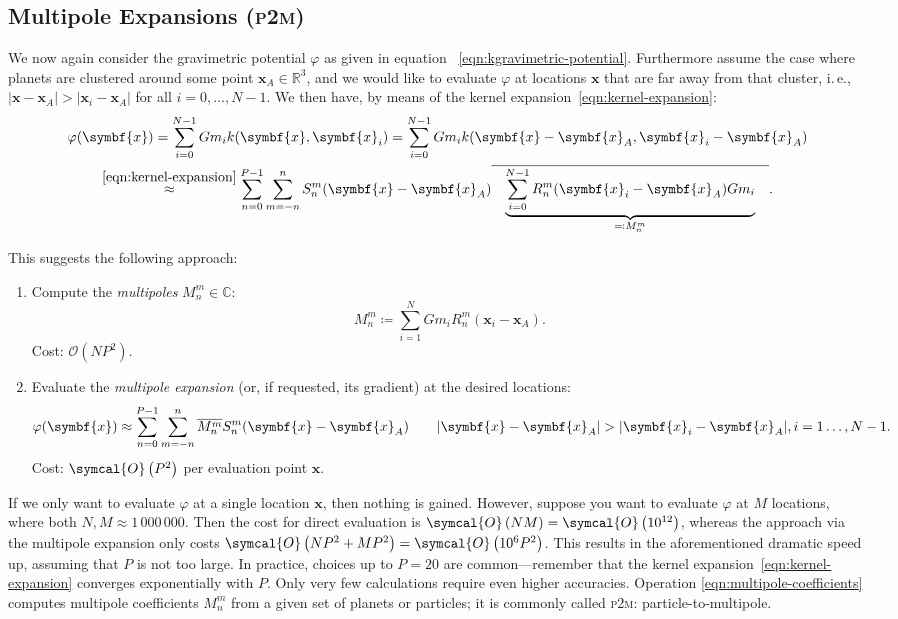 \documentclass{scrbook}
\newcommand{\PtoM}{\textsc{p2m}}
\newcommand{\reals}{\ensuremath{\mathbb{R}}}
\newcommand{\complex}{\mathbb{C}}
\newcommand{\wholespace}{\ensuremath{\reals^3}}
\newcommand{\vv}[1]{\ensuremath{\symbf{#1}}} %
\newcommand{\bigO}[1]{\ensuremath{\symcal{O}\left({#1}\right)}}
\begin{document}
\subsection{Multipole Expansions (\PtoM)}
We now again consider the gravimetric potential $\varphi$ as given in equation~%
\eqref{eqn:kgravimetric-potential}. Furthermore assume the case where planets
are clustered around some point $\vv{x}_A\in\wholespace$, and we would like to
evaluate $\varphi$ at locations $\vv{x}$ that are far away from that cluster,
i.\,e., $|\vv{x}-\vv{x}_A| > |\vv{x}_i-\vv{x}_A|$ for all $i=0,\dotsc,N-1$. We
then have, by means of the kernel expansion~\eqref{eqn:kernel-expansion}:
\begin{multline}
\varphi(\vv{x})
= \sum_{i=0}^{N-1}Gm_i k(\vv{x},\vv{x}_i)
= \sum_{i=0}^{N-1}Gm_i k(\vv{x}-\vv{x}_A,\vv{x}_i-\vv{x}_A) \\
\stackrel{\eqref{eqn:kernel-expansion}}{\approx}
\sum_{n=0}^{P-1}\sum_{m=-n\vphantom{0}}^n
S_n^m(\vv{x}-\vv{x}_A)
\overline{\quad\underbrace{\sum_{i=0}^{N-1}R_n^m(\vv{x}_i-\vv{x}_A)Gm_i}_%
{\eqqcolon M_n^m}\quad}.
\end{multline}

This suggests the following approach:
\begin{enumerate}
\item Compute the \emph{multipoles} $M_n^m\in\complex$:
\begin{equation}\label{eqn:multipole-coefficients}
M_n^m \coloneqq \sum_{i=1}^N Gm_iR_n^m(\vv{x}_i-\vv{x}_A).
\end{equation}
Cost: $\mathcal{O}(NP^2)$.
\item Evaluate the \emph{multipole expansion} (or, if requested, its gradient)
at the desired locations:
\begin{equation}\label{eqn:multipole-expansion}
\varphi(\vv{x})\approx
\sum_{n=0}^{P-1}\sum_{m=-n\vphantom{0}}^n \overline{M_n^m}S_n^m(\vv{x}-\vv{x}_A)
\qquad
|\vv{x}-\vv{x}_A| > |\vv{x}_i-\vv{x}_A|, i=1\dotsc,N-1.
\end{equation}
Cost: \bigO{P^2} per evaluation point $\vv{x}$.
\end{enumerate}

If we only want to evaluate $\varphi$ at a single location $\vv{x}$, then
nothing is gained. However, suppose you want to evaluate $\varphi$ at
$M$ locations, where both $N,M\approx 1\,000\,000$. Then the cost for direct
evaluation is $\bigO{NM}=\bigO{10^{12}}$, whereas the approach via the
multipole expansion only costs $\bigO{NP^2 + MP^2}=\bigO{10^6P^2}$. This
results in the aforementioned dramatic speed up, assuming that $P$ is not too
large. In practice, choices up to $P=20$ are common---remember that the kernel
expansion~\eqref{eqn:kernel-expansion} converges exponentially with $P$. Only
very few calculations require even higher accuracies. Operation
\eqref{eqn:multipole-coefficients} computes multipole coefficients $M_n^m$ from
a given set of planets or particles; it is commonly called \PtoM:
particle-to-multipole.
\end{document}
